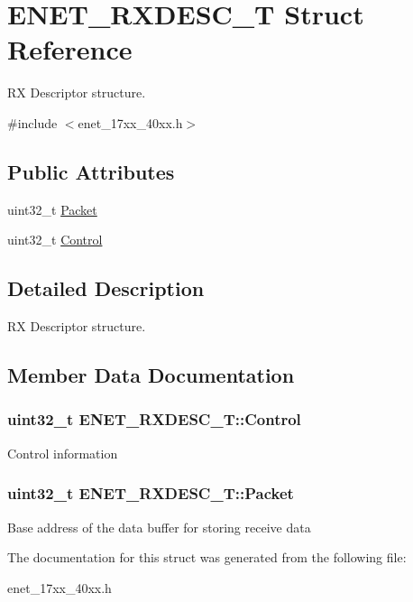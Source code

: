 \hypertarget{struct_e_n_e_t___r_x_d_e_s_c___t}{\section{E\+N\+E\+T\+\_\+\+R\+X\+D\+E\+S\+C\+\_\+\+T Struct Reference}
\label{struct_e_n_e_t___r_x_d_e_s_c___t}
}


R\+X Descriptor structure.  




{\ttfamily \#include $<$enet\+\_\+17xx\+\_\+40xx.\+h$>$}

\subsection*{Public Attributes}
\begin{DoxyCompactItemize}
\item 
uint32\+\_\+t \hyperlink{struct_e_n_e_t___r_x_d_e_s_c___t_a6fffb262a03d26e426701e6fba82a7ff}{Packet}
\item 
uint32\+\_\+t \hyperlink{struct_e_n_e_t___r_x_d_e_s_c___t_a4e7065600418654b06d854ea66dfe259}{Control}
\end{DoxyCompactItemize}


\subsection{Detailed Description}
R\+X Descriptor structure. 

\subsection{Member Data Documentation}
\hypertarget{struct_e_n_e_t___r_x_d_e_s_c___t_a4e7065600418654b06d854ea66dfe259}{
\subsubsection[{Control}]{\setlength{\rightskip}{0pt plus 5cm}uint32\+\_\+t E\+N\+E\+T\+\_\+\+R\+X\+D\+E\+S\+C\+\_\+\+T\+::\+Control}}\label{struct_e_n_e_t___r_x_d_e_s_c___t_a4e7065600418654b06d854ea66dfe259}
Control information \hypertarget{struct_e_n_e_t___r_x_d_e_s_c___t_a6fffb262a03d26e426701e6fba82a7ff}{
\subsubsection[{Packet}]{\setlength{\rightskip}{0pt plus 5cm}uint32\+\_\+t E\+N\+E\+T\+\_\+\+R\+X\+D\+E\+S\+C\+\_\+\+T\+::\+Packet}}\label{struct_e_n_e_t___r_x_d_e_s_c___t_a6fffb262a03d26e426701e6fba82a7ff}
Base address of the data buffer for storing receive data 

The documentation for this struct was generated from the following file\+:\begin{DoxyCompactItemize}
\item 
enet\+\_\+17xx\+\_\+40xx.\+h\end{DoxyCompactItemize}
